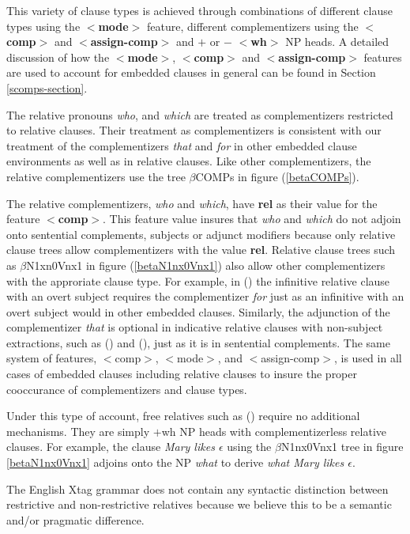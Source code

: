 
This variety of clause types is achieved through combinations of
different clause types using the {\bf $<$mode$>$} feature, different
complementizers using the {\bf $<$comp$>$} and {\bf $<$assign-comp$>$}
and {\bf $+$} or {\bf $-$} {\bf $<$wh$>$} NP heads. A detailed
discussion of how the {\bf $<$mode$>$}, {\bf $<$comp$>$} and {\bf
$<$assign-comp$>$} features are used to account for embedded clauses
in general can be found in Section
\ref{scomps-section}.  

The relative pronouns {\it who}, and {\it which} are treated as
complementizers restricted to relative clauses.  Their treatment as
complementizers is consistent with our treatment of the
complementizers {\it that} and {\it for} in other embedded clause
environments as well as in relative clauses. Like other
complementizers, the relative complementizers use the tree
$\beta$COMPs in figure (\ref{betaCOMPs}).


\begin{figure}[htbp]
\end{figure}

The relative complementizers, {\it who} and {\it which}, have {\bf
rel} as their value for the feature {\bf $<$comp$>$}. This feature
value insures that {\it who} and {\it which} do not adjoin onto
sentential complements, subjects or adjunct modifiers because only
relative clause trees allow complementizers with the value {\bf rel}.
Relative clause trees such as $\beta$N1xn0Vnx1 in figure
(\ref{betaN1nx0Vnx1}) also allow other complementizers with the
approriate clause type. For example, in () the infinitive
relative clause with an overt subject requires the complementizer {\it
for} just as an infinitive with an overt subject would in other
embedded clauses. Similarly, the adjunction of the complementizer {\it
that} is optional in indicative relative clauses with non-subject
extractions, such as () and (), just as it is in
sentential complements. The same system of features, $<$comp$>$,
$<$mode$>$, and $<$assign-comp$>$, is used in all cases of embedded
clauses including relative clauses to insure the proper cooccurance of
complementizers and clause types.

Under this type of account, free relatives such as () require
no additional mechanisms. They are simply $+$wh NP heads with
complementizerless relative clauses. For example, the clause {\it Mary likes
$\epsilon$} using the $\beta$N1nx0Vnx1 tree in figure
\ref{betaN1nx0Vnx1} adjoins onto the NP {\it what} to derive {\it
what Mary likes $\epsilon$}.

The English Xtag grammar does not contain any  syntactic distinction between
restrictive and non-restrictive relatives because we believe this to
be a semantic and/or pragmatic difference.
